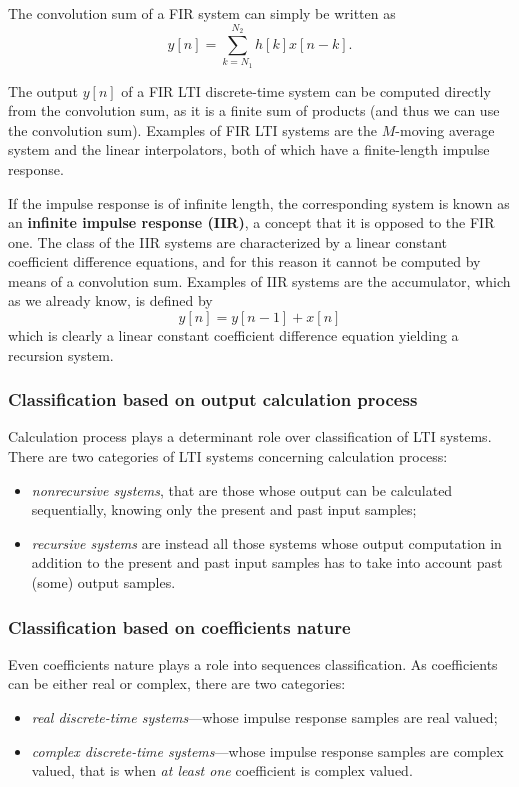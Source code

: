 \documentclass[\documentfontsize, twocolumn]{\classname}
\begin{document}
The convolution sum of a FIR system can simply be written as
\[
    y[n]=\sum_{k=N_1}^{N_2} h[k]x[n-k].
\]

The output $y[n]$ of a FIR LTI discrete-time system can be computed directly from the convolution sum, as it is a finite sum of products (and thus we can use the convolution sum). Examples of FIR LTI systems are the $M$-moving average system and the linear interpolators, both of which have a finite-length impulse response.

If the impulse response is of infinite length, the corresponding system is known as an \textbf{infinite impulse response (IIR)}, a concept that it is opposed to the FIR one. The class of the IIR systems are characterized by a linear constant coefficient difference equations, and for this reason it cannot be computed by means of a convolution sum. Examples of IIR systems are the accumulator, which as we already know, is defined by
\[
    y[n] = y[n-1] + x[n]
\] 
which is clearly a linear constant coefficient difference equation yielding a recursion system.

\subsubsection{Classification based on output calculation process}
Calculation process plays a determinant role over classification of LTI systems. There are two categories of LTI systems concerning calculation process:
\begin{itemize}
    \item \emph{nonrecursive systems}, that are those whose output can be calculated sequentially, knowing only the present and past input samples;
    \item \emph{recursive systems} are instead all those systems whose output computation in addition to the present and past input samples has to take into account past (some) output samples.
\end{itemize}

\subsubsection{Classification based on coefficients nature}
Even coefficients nature plays a role into sequences classification. As coefficients can be either real or complex, there are two categories:
\begin{itemize}
    \item \emph{real discrete-time systems}---whose impulse response samples are real valued;
    \item \emph{complex discrete-time systems}---whose impulse response samples are complex valued, that is when \emph{at least one} coefficient is complex valued.
\end{itemize}
\end{document}
